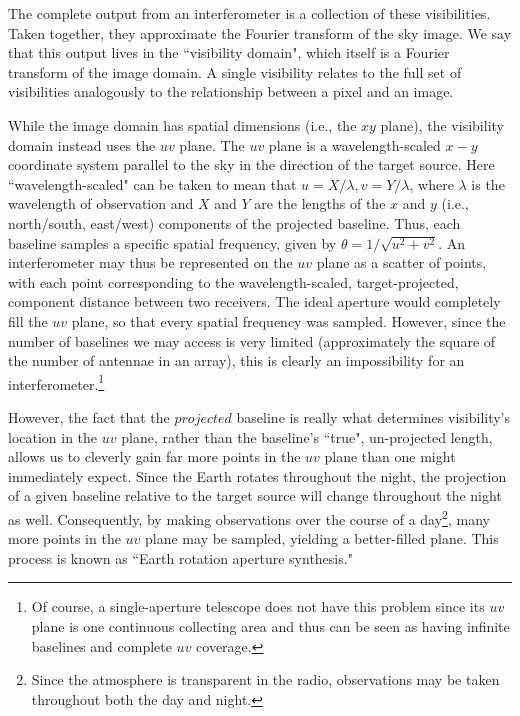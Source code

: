 The complete output from an interferometer is a collection of these visibilities. Taken together, they approximate the Fourier transform of the sky image. We say that this output lives in the ``visibility domain", which itself is a Fourier transform of the image domain. A single visibility relates to the full set of visibilities analogously to the relationship between a pixel and an image.


While the image domain has spatial dimensions (i.e., the $xy$ plane), the visibility domain instead uses the $uv$ plane. The $uv$ plane is a wavelength-scaled $x-y$ coordinate system parallel to the sky in the direction of the target source. Here ``wavelength-scaled" can be taken to mean that $u = X/\lambda, v = Y/\lambda$, where $\lambda$ is the wavelength of observation and $X$ and $Y$ are the lengths of the $x$ and $y$ (i.e., north/south, east/west) components of the projected baseline. Thus, each baseline samples a specific spatial frequency, given by $\theta = 1/\sqrt{u^2 + v^2}$. An interferometer may thus be represented on the $uv$ plane as a scatter of points, with each point corresponding to the wavelength-scaled, target-projected, component distance between two receivers. The ideal aperture would completely fill the $uv$ plane, so that every spatial frequency was sampled. However, since the number of baselines we may access is very limited (approximately the square of the number of antennae in an array), this is clearly an impossibility for an interferometer.\footnote{Of course, a single-aperture telescope does not have this problem since its $uv$ plane is one continuous collecting area and thus can be seen as having infinite baselines and complete $uv$ coverage.}


However, the fact that the $projected$ baseline is really what determines visibility's location in the $uv$ plane, rather than the baseline's ``true", un-projected length, allows us to cleverly gain far more points in the $uv$ plane than one might immediately expect. Since the Earth rotates throughout the night, the projection of a given baseline relative to the target source will change throughout the night as well. Consequently, by making observations over the course of a day\footnote{Since the atmosphere is transparent in the radio, observations may be taken throughout both the day and night.}, many more points in the $uv$ plane may be sampled, yielding a better-filled plane. This process is known as ``Earth rotation aperture synthesis."

